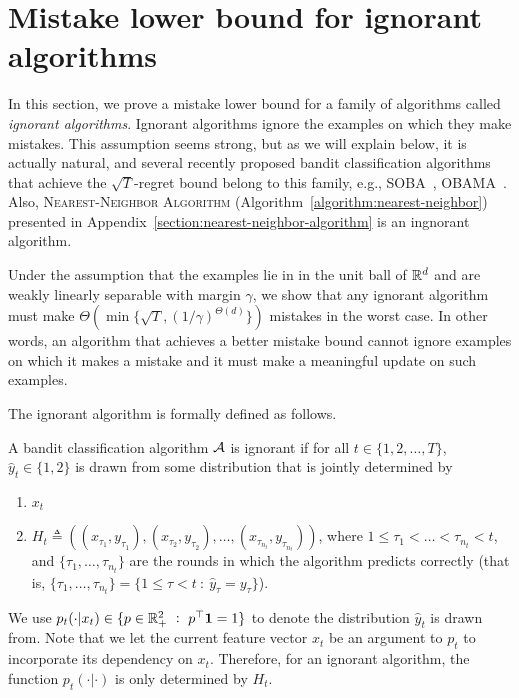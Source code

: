 \section{Mistake lower bound for ignorant algorithms}
\label{section:mistake-lower-bound-for-ignorant-algorithms}

In this section, we prove a mistake lower bound for a family of algorithms
called \textit{ignorant algorithms}. Ignorant algorithms ignore the examples on
which they make mistakes. This assumption seems strong, but as we will explain
below, it is actually natural, and several recently proposed bandit
classification algorithms that achieve the $\sqrt{T}$-regret bound belong to
this family, e.g., SOBA~\citep{Beygelzimer-Orabona-Zhang-2017},
OBAMA~\citep{Foster-Kale-Luo-Mohri-Sridharan-2018}. Also,
\textsc{Nearest-Neighbor Algorithm} (Algorithm~\ref{algorithm:nearest-neighbor})
presented in Appendix~\ref{section:nearest-neighbor-algorithm} is an ingnorant
algorithm.

Under the assumption that the examples lie in in the unit ball of $\mathbb{R}^d$ and are
weakly linearly separable with margin $\gamma$, we show that any ignorant
algorithm must make $\Theta\left(\min\{\sqrt{T},
(1/\gamma)^{\Theta(d)}\}\right)$ mistakes in the worst case. In other words, an
algorithm that achieves a better mistake bound cannot ignore examples on which
it makes a mistake and it must make a meaningful update on such examples.

The ignorant algorithm is formally defined as follows.
\begin{definition}
\label{definition:ignorant-algorithm}
A bandit classification algorithm $\mathcal{A}$ is ignorant if for all $t \in
\{1,2,\dots,T\}$, $\widehat y_t\in \{1,2\}$ is drawn from some distribution that
is jointly determined by
\begin{enumerate}
\item $x_t$
\item $H_t \triangleq \left( (x_{\tau_1}, y_{\tau_1}), (x_{\tau_2}, y_{\tau_2}), \ldots, (x_{\tau_{n_t}}, y_{\tau_{n_t}}) \right)$,
where $1 \le \tau_1 < \dots < \tau_{n_t} < t$, and $\{\tau_1, \ldots, \tau_{n_t}\}$
are the rounds in which the algorithm predicts correctly (that is,
$\{\tau_1, \ldots, \tau_{n_t}\} = \{1 \le \tau < t ~:~ \widehat y_\tau=y_\tau\}$).
\end{enumerate}
We use $p_t(\cdot|x_t)\in \{p\in \mathbb{R}_+^2 ~:~ p^\top\mathbf{1}=1\}$ to denote
the distribution $\widehat y_t$ is drawn from. Note that we let the current
feature vector $x_t$ be an argument to $p_t$ to incorporate its dependency on
$x_t$. Therefore, for an ignorant algorithm, the function $p_t(\cdot|\cdot)$ is
only determined by $H_t$.
\end{definition}

